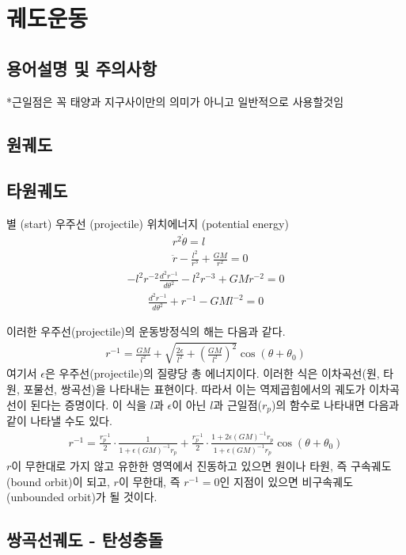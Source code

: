 \documentclass[9pt]{amsbook}
\begin{document}
\chapter{궤도운동}
\section{용어설명 및 주의사항}
*근일점은 꼭 태양과 지구사이만의 의미가 아니고 일반적으로 사용할것임
\section{원궤도}
\section{타원궤도}
별 (start) 우주선 (projectile) 위치에너지 (potential energy)
\begin{align}
&r^2 \dot{\theta} = l
\\&\ddot{r}-\frac{l^2}{r^3}+\frac{GM}{r^2} = 0
\end{align}
\begin{align}
	-l^2r^{-2}\frac{d^2r^{-1}}{d\theta^2}-l^2r^{-3}+GMr^{-2} = 0
\end{align}
\begin{align}
	\frac{d^2r^{-1}}{d\theta^2}+r^{-1}-GMl^{-2} = 0
\end{align}

이러한 우주선(projectile)의 운동방정식의 해는 다음과 같다.
\begin{align}
	r^{-1} = \frac{GM}{l^2} + \sqrt{\frac{2\epsilon}{l^2}+\left(\frac{GM}{l^2}\right)^2}\cos(\theta+\theta_0)
\end{align}
여기서 $\epsilon$은 우주선(projectile)의 질량당 총 에너지이다. 이러한 식은 이차곡선(원, 타원, 포물선, 쌍곡선)을 나타내는 표현이다. 따라서 이는 역제곱힘에서의 궤도가 이차곡선이 된다는 증명이다.
이 식을 $l$과 $\epsilon$이 아닌 $l$과 근일점($r_p$)의 함수로 나타내면 다음과 같이 나타낼 수도 있다.
\begin{align}
	r^{-1} = \frac{r_p^{-1}}{2}\cdot\frac{1}{1+\epsilon (GM)^{-1}r_p} +\frac{r_p^{-1}}{2}\cdot\frac{1+2\epsilon (GM)^{-1}r_p}{1+\epsilon (GM)^{-1}r_p}\cos(\theta+\theta_0)
\end{align}
$r$이 무한대로 가지 않고 유한한 영역에서 진동하고 있으면 원이나 타원, 즉 구속궤도(bound orbit)이 되고, $r$이 무한대, 즉 $r^{-1}=0$인 지점이 있으면 비구속궤도(unbounded orbit)가 될 것이다.

\section{쌍곡선궤도 - 탄성충돌}
\end{document}
